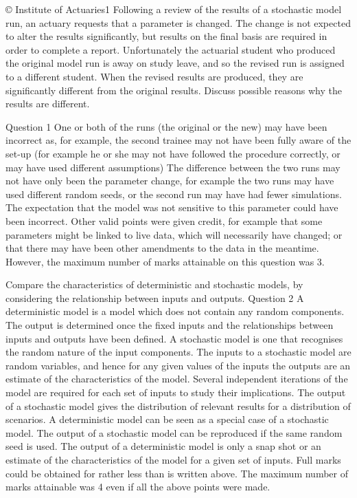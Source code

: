 \documentclass[a4paper,12pt]{article}
\begin{document}
\begin{enumerate}

© Institute of Actuaries1
Following a review of the results of a stochastic model run, an actuary requests that a
parameter is changed. The change is not expected to alter the results significantly,
but results on the final basis are required in order to complete a report. Unfortunately
the actuarial student who produced the original model run is away on study leave, and
so the revised run is assigned to a different student.
When the revised results are produced, they are significantly different from the
original results.
Discuss possible reasons why the results are different.

Question 1
One or both of the runs (the original or the new) may have been incorrect as, for example, the
second trainee may not have been fully aware of the set-up (for example he or she may not
have followed the procedure correctly, or may have used different assumptions)
The difference between the two runs may not have only been the parameter change, for
example the two runs may have used different random seeds, or the second run may have had
fewer simulations.
The expectation that the model was not sensitive to this parameter could have been incorrect.
Other valid points were given credit, for example that some parameters might be linked to
live data, which will necessarily have changed; or that there may have been other
amendments to the data in the meantime. However, the maximum number of marks
attainable on this question was 3.

Compare the characteristics of deterministic and stochastic models, by considering the
relationship between inputs and outputs.
Question 2
A deterministic model is a model which does not contain any random components.
The output is determined once the fixed inputs and the relationships between inputs and
outputs have been defined.
A stochastic model is one that recognises the random nature of the input components.
The inputs to a stochastic model are random variables, and hence for any given values of the
inputs the outputs are an estimate of the characteristics of the model.
Several independent iterations of the model are required for each set of inputs to study their
implications.
The output of a stochastic model gives the distribution of relevant results for a distribution
of scenarios.
A deterministic model can be seen as a special case of a stochastic model.
The output of a stochastic model can be reproduced if the same random seed is used.
The output of a deterministic model is only a snap shot or an estimate of the characteristics
of the model for a given set of inputs.
Full marks could be obtained for rather less than is written above. The maximum number
of marks attainable was 4 even if all the above points were made.


\end{enumerate}
\end{document}
